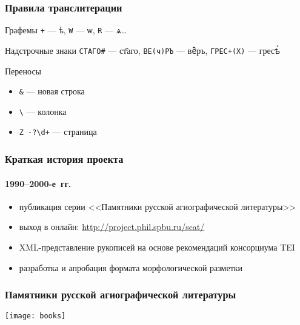 \begin{frame}
  \frametitle{Правила транслитерации}

  \begin{block}{Графемы}
    \texttt{+} --- {\agio ѣ}, \texttt{W} --- {\agio ѡ}, \texttt{R} --- {\agio ѧ}\ldots
  \end{block}

  \begin{block}{Надстрочные знаки}
    \texttt{СТАГО\#} --- {\agio ст҃аго}, \texttt{BE(ч)PЪ} --- {\agio ве҇ⷱръ}, \texttt{ГРЕС+(Х)} --- {\agio гресѣⷯ}
  \end{block}

  \begin{block}{Переносы}
    \begin{itemize}
      \item \texttt{\&} --- новая строка
      \item \texttt{\textbackslash} --- колонка
      \item \texttt{Z -?\textbackslash{}d+} --- страница
    \end{itemize}
  \end{block}
\end{frame}

\begin{frame}
  \frametitle{Краткая история проекта}
  \framesubtitle{1990--2000-е~гг.}

  \begin{block}{}
    \begin{itemize}
      \item публикация серии <<Памятники русской агиографической литературы>>\autocite{coll:2012}
      \item выход в онлайн: \url{http://project.phil.spbu.ru/scat/}
      \item XML-представление рукописей на основе рекомендаций консорциума TEI\autocite{alexeev:2009}
      \item \alert{разработка и апробация формата морфологической разметки}\autocite{ivanova:2006}
    \end{itemize}
  \end{block}
\end{frame}

\begin{frame}
  \frametitle{Памятники русской агиографической литературы}

  \begin{center}
    \texttt{[image: books]}
  \end{center}
\end{frame}

